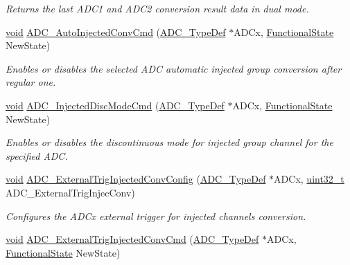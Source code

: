 \begin{DoxyCompactItemize}
\begin{DoxyCompactList}\small\item\em Returns the last A\+D\+C1 and A\+D\+C2 conversion result data in dual mode. \end{DoxyCompactList}\item 
\hyperlink{usb__devapi_8h_afabf60e7f57651d6d595a02c75f07cd0}{void} \hyperlink{group___a_d_c___private___functions_ga1ff9c3b8e4bbdd2addfd227f1a506a66}{A\+D\+C\+\_\+\+Auto\+Injected\+Conv\+Cmd} (\hyperlink{struct_a_d_c___type_def}{A\+D\+C\+\_\+\+Type\+Def} $\ast$A\+D\+Cx, \hyperlink{agilefox_2library_2inc_2stm32f10x__type_8h_ac9a7e9a35d2513ec15c3b537aaa4fba1}{Functional\+State} New\+State)
\begin{DoxyCompactList}\small\item\em Enables or disables the selected A\+DC automatic injected group conversion after regular one. \end{DoxyCompactList}\item 
\hyperlink{usb__devapi_8h_afabf60e7f57651d6d595a02c75f07cd0}{void} \hyperlink{group___a_d_c___private___functions_ga0b583b94183fa4ff287177b9ee808092}{A\+D\+C\+\_\+\+Injected\+Disc\+Mode\+Cmd} (\hyperlink{struct_a_d_c___type_def}{A\+D\+C\+\_\+\+Type\+Def} $\ast$A\+D\+Cx, \hyperlink{agilefox_2library_2inc_2stm32f10x__type_8h_ac9a7e9a35d2513ec15c3b537aaa4fba1}{Functional\+State} New\+State)
\begin{DoxyCompactList}\small\item\em Enables or disables the discontinuous mode for injected group channel for the specified A\+DC. \end{DoxyCompactList}\item 
\hyperlink{usb__devapi_8h_afabf60e7f57651d6d595a02c75f07cd0}{void} \hyperlink{group___a_d_c___private___functions_gafc02ce1e84e96b692adf085f61a0bca6}{A\+D\+C\+\_\+\+External\+Trig\+Injected\+Conv\+Config} (\hyperlink{struct_a_d_c___type_def}{A\+D\+C\+\_\+\+Type\+Def} $\ast$A\+D\+Cx, \hyperlink{_p_e___types_8h_a33594304e786b158f3fb30289278f5af}{uint32\+\_\+t} A\+D\+C\+\_\+\+External\+Trig\+Injec\+Conv)
\begin{DoxyCompactList}\small\item\em Configures the A\+D\+Cx external trigger for injected channels conversion. \end{DoxyCompactList}\item 
\hyperlink{usb__devapi_8h_afabf60e7f57651d6d595a02c75f07cd0}{void} \hyperlink{group___a_d_c___private___functions_gad81d134c083d8f407c819e6f4722d553}{A\+D\+C\+\_\+\+External\+Trig\+Injected\+Conv\+Cmd} (\hyperlink{struct_a_d_c___type_def}{A\+D\+C\+\_\+\+Type\+Def} $\ast$A\+D\+Cx, \hyperlink{agilefox_2library_2inc_2stm32f10x__type_8h_ac9a7e9a35d2513ec15c3b537aaa4fba1}{Functional\+State} New\+State)

\end{DoxyCompactItemize}
